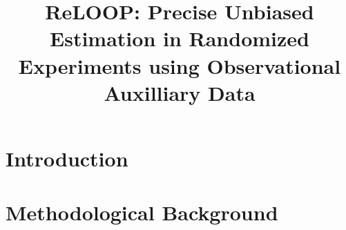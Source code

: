 \documentclass[12pt]{article}
\title{ReLOOP: Precise Unbiased Estimation in Randomized Experiments
  using Observational Auxilliary Data}
\begin{document}
\maketitle
\section{Introduction}

\section{Methodological Background}











\end{document}
